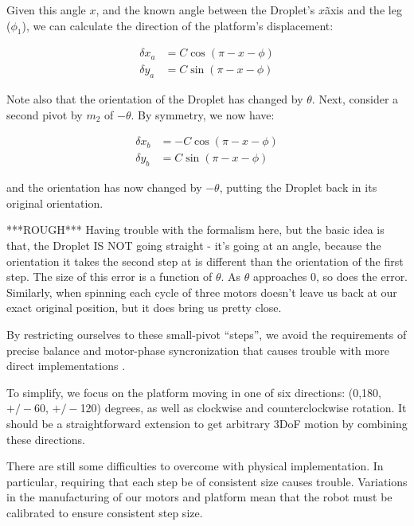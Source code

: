 \documentclass[letterpaper, 10pt, conference]{ieeeconf}
\begin{document}
Given this angle $x$, and the known angle between the Droplet's $x$\~axis and the leg ($\phi_1$), we can calculate the direction of the platform's displacement:

\begin{align*}
\delta x_a &= C \cos(\pi - x - \phi)\\
\delta y_a &= C \sin(\pi - x - \phi)
\end{align*}

Note also that the orientation of the Droplet has changed by $\theta$. Next, consider a second pivot by $m_2$ of $-\theta$. By symmetry, we now have:

\begin{align*}
\delta x_b &= -C\cos(\pi -x -\phi)\\
\delta y_b &= C \sin(\pi - x - \phi)
\end{align*}

and the orientation has now changed by $-\theta$, putting the Droplet back in its original orientation. 

***ROUGH***
Having trouble with the formalism here, but the basic idea is that, the Droplet IS NOT going straight - it's going at an angle, because the orientation it takes the second step at is different than the orientation of the first step. The size of this error is a function of $\theta$. As $\theta$ approaches $0$, so does the error. Similarly, when spinning each cycle of three motors doesn't leave us back at our exact original position, but it does bring us pretty close.

By restricting ourselves to these small-pivot ``steps'', we avoid the requirements of precise balance and motor-phase syncronization that causes trouble with more direct implementations \cite{Vartholomeos2006}.

To simplify, we focus on the platform moving in one of six directions: (0,180, $+/-$60, $+/-$120) degrees, as well as clockwise and counterclockwise rotation. It should be a straightforward extension to get arbitrary 3DoF motion by combining these directions.

There are still some difficulties to overcome with physical implementation. In particular, requiring that each step be of consistent size causes trouble. Variations in the manufacturing of our motors and platform mean that the robot must be calibrated to ensure consistent step size.
\end{document}
